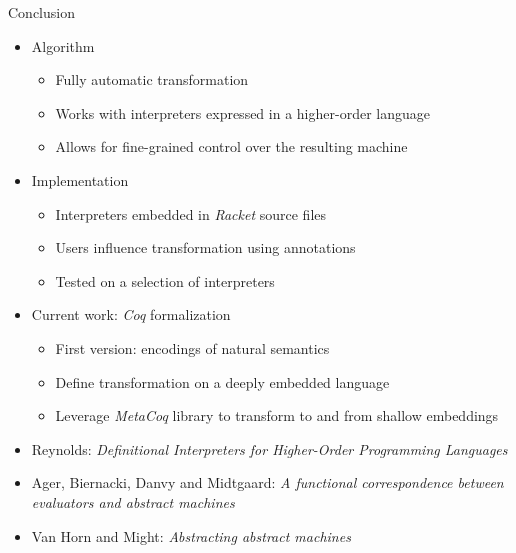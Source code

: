 \documentclass[handout]{beamer}
\begin{document}
\begin{frame}{Conclusion}
  \begin{itemize}
    \item Algorithm \pause
    \begin{itemize}
      \item Fully automatic transformation \pause
      \item Works with interpreters expressed in a higher-order language \pause
      \item Allows for fine-grained control over the resulting machine \pause
    \end{itemize}
    \pause
    \item Implementation \pause
    \begin{itemize}
      \item Interpreters embedded in \textit{Racket} source files \pause
      \item Users influence transformation using annotations \pause
      \item Tested on a selection of interpreters
    \end{itemize}
    \pause
    \item Current work: \textit{Coq} formalization \pause
    \begin{itemize}
      \item First version: encodings of natural semantics \pause
      \item Define transformation on a deeply embedded language \pause
      \item Leverage \textit{MetaCoq} library to transform to and from shallow embeddings
    \end{itemize}
  \end{itemize}  
\end{frame}

\begin{frame}
  \begin{itemize}
    \item Reynolds: \textit{Definitional Interpreters for Higher-Order Programming Languages}
    \item Ager, Biernacki, Danvy and Midtgaard: \textit{A functional correspondence between evaluators and abstract machines}
    \item Van Horn and Might: \textit{Abstracting abstract machines}
  \end{itemize}
\end{frame}
\end{document}
